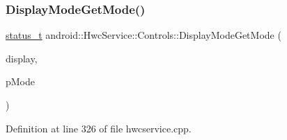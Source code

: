 \mbox{\label{classandroid_1_1HwcService_1_1Controls_a359b41bbda3b6b5507dd23436cdca678}} 
\subsubsection{\texorpdfstring{Display\+Mode\+Get\+Mode()}{DisplayModeGetMode()}}
{\footnotesize\ttfamily \mbox{\hyperlink{hwcserviceapi_8h_a3806fb2027d9a316d8ca8d9b8b8eb96f}{status\+\_\+t}} android\+::\+Hwc\+Service\+::\+Controls\+::\+Display\+Mode\+Get\+Mode (\begin{DoxyParamCaption}\item[{uint32\+\_\+t}]{display,  }\item[{\mbox{\hyperlink{hwcserviceapi_8h_a6e13f5285374b86aab82ec0c0ba62d7a}{Hwcs\+Display\+Mode\+Info}} $\ast$}]{p\+Mode }\end{DoxyParamCaption})}



Definition at line 326 of file hwcservice.\+cpp.


